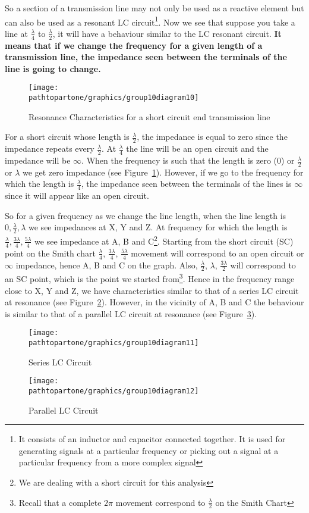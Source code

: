 So a section of a transmission line may not only be used as a reactive element but can also be used as a resonant LC circuit\footnote{
It consists of an inductor and capacitor connected together. It is used for generating signals at a particular frequency or picking out a signal at a particular frequency from a more complex signal
}. Now we see that suppose you take a line at $ \frac{\lambda}{4} $ to $ \frac{\lambda}{2} $, it will have a behaviour similar to the LC resonant circuit. \textbf{It means that if we change the frequency for a given length of a transmission line, the impedance seen between the terminals of the line is going to change.}
\begin{figure}[h]
\centering
\texttt{[image: \\pathtopartone/graphics/group10diagram10]}
\caption{Resonance Characteristics for a short circuit end transmission line}
\label{fig:group10diagram11}
\end{figure}

For a short circuit whose length is $ \frac{\lambda}{2} $, the impedance is equal to zero since the impedance repeats every $\frac{\lambda}{2}$. At $ \frac{\lambda}{4} $ the line will be an open circuit and the impedance will be $\infty$. When the frequency is such that the length is zero (0) or $ \frac{\lambda}{2} $ or $ \lambda $ we get zero impedance (see Figure~\ref{fig:group10diagram11}). However, if we go to the frequency for which the length is $ \frac{\lambda}{4} $, the impedance seen between the terminals of the lines is $\infty$ since it will appear like an open circuit.

So for a given frequency as we change the line length, when the line length is $ 0, \frac{\lambda}{2}, \lambda $ we see impedances at X, Y and Z. At frequency for which the length is $ \frac{\lambda}{4}, \frac{3\lambda}{4}, \frac{5\lambda}{4} $ we see impedance at A, B and C\footnote{
We are dealing with a short circuit for this analysis
}. Starting from the short circuit (SC) point on the Smith chart $ \frac{\lambda}{4} $, $ \frac{3\lambda}{4} $, $ \frac{5\lambda}{4} $ movement will correspond to an open circuit or $ \infty $ impedance, hence A, B and C on the graph. Also, $ \frac{\lambda}{2} $, $ \lambda $, $ \frac{3\lambda}{2} $ will correspond to an SC point, which is the point we started from\footnote{
Recall that a complete $ 2\pi $ movement correspond to $ \frac{\lambda}{2} $ on the Smith Chart
}. Hence in the frequency range close to X, Y and Z, we have characteristics similar to that of a series LC circuit
at resonance (see Figure~\ref{fig:group10diagram12}). However, in the vicinity of A, B and C the behaviour is similar to that of a parallel LC circuit at resonance (see Figure~\ref{fig:group10diagram13}). 
\begin{figure}[h]
\centering
\texttt{[image: \\pathtopartone/graphics/group10diagram11]}
\caption{Series LC Circuit}
\label{fig:group10diagram12}
\end{figure}
\begin{figure}[h]
\centering
\texttt{[image: \\pathtopartone/graphics/group10diagram12]}
\caption{Parallel LC Circuit}
\label{fig:group10diagram13}
\end{figure}

